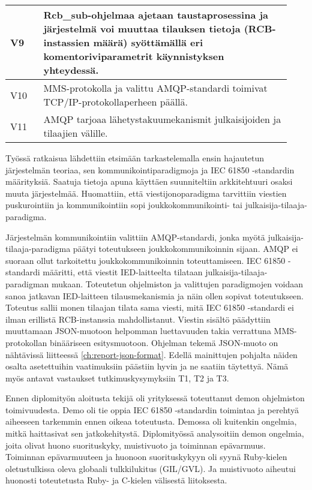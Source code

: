 \begin{table}[ht!]
\begin{tabular}{p{0.11\linewidth} | p{0.82\linewidth}}
		V9 & Rcb\_sub-ohjelmaa ajetaan taustaprosessina ja järjestelmä voi muuttaa tilauksen tietoja (RCB-instassien määrä) syöttämällä eri komentoriviparametrit käynnistyksen yhteydessä. \\
		\hline
		V10 & MMS-protokolla ja valittu AMQP-standardi toimivat TCP/IP-protokollaperheen päällä. \\
		\hline
		V11 & AMQP tarjoaa lähetystakuumekanismit julkaisijoiden ja tilaajien välille. \\
		\hline
	\end{tabular}
\end{table}

Työssä ratkaisua lähdettiin etsimään tarkastelemalla ensin hajautetun järjestelmän teoriaa, sen kommunikointiparadigmoja ja IEC 61850 -standardin määrityksiä. Saatuja tietoja apuna käyttäen suunniteltiin arkkitehtuuri osaksi muuta järjestelmää. Huomattiin, että viestijonoparadigma tarvittiin viestien puskurointiin ja kommunikointiin sopi jouk\-ko\-kom\-mu\-ni\-koin\-ti- tai julkaisija-tilaaja-paradigma.

Järjestelmän kommunikointiin valittiin AMQP-standardi, jonka myötä julkaisija-tilaaja-paradigma päätyi toteutukseen joukkokommunikoinnin sijaan. AMQP ei suoraan ollut tarkoitettu joukkokommunikoinnin toteuttamiseen. IEC 61850 -standardi määritti, että viestit IED-laitteelta tilataan julkaisija-tilaaja-paradigman mukaan. Toteutetun ohjelmiston ja valittujen paradigmojen voidaan sanoa jatkavan IED-laitteen tilausmekanismia ja näin ollen sopivat toteutukseen. Toteutus sallii monen tilaajan tilata sama viesti, mitä IEC 61850 -standardi ei ilman erillistä RCB-instanssia mahdollistanut. Viestin sisältö päädyttiin muuttamaan JSON-muotoon helpomman luettavuuden takia verrattuna MMS-protokollan binääriseen esitysmuotoon. Ohjelman tekemä JSON-muoto on nähtävissä liitteessä \ref{ch:report-json-format}. Edellä mainittujen pohjalta näiden osalta asetettuihin vaatimuksiin päästiin hyvin ja ne saatiin täytettyä. Nämä myös antavat vastaukset tutkimuskysymyksiin T1, T2 ja T3.

Ennen diplomityön aloitusta tekijä oli yrityksessä toteuttanut demon ohjelmiston toimivuudesta. Demo oli tie oppia IEC 61850 -standardin toimintaa ja perehtyä aiheeseen tarkemmin ennen oikeaa toteutusta. Demossa oli kuitenkin ongelmia, mitkä haittasivat sen jatkokehitystä. Diplomityössä analysoitiin demon ongelmia, joita olivat huono suorituskyky, muistivuoto ja toiminnan epävarmuus. Toiminnan epävarmuuteen ja huonoon suorituskykyyn oli syynä Ruby-kielen oletustulkissa oleva globaali tulkkilukitus (GIL/GVL). Ja muistivuoto aiheutui huonosti toteutetusta Ruby- ja C-kielen välisestä liitoksesta.

